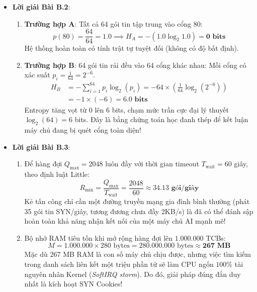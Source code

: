 \begin{itemize}
  \item \textbf{Lời giải Bài B.2}:
  \begin{enumerate}
    \item \textbf{Trường hợp A}: Tất cả 64 gói tin tập trung vào cổng 80:
    \begin{equation*}
    p(80) = \frac{64}{64} = 1.0 \implies H_A = - (1.0 \log_2 1.0) = \mathbf{0 \text{ bits}}
    \end{equation*}
    Hệ thống hoàn toàn có tính trật tự tuyệt đối (không có độ bất định).
    \item \textbf{Trường hợp B}: 64 gói tin rải đều vào 64 cổng khác nhau:
    Mỗi cổng có xác suất $p_i = \frac{1}{64} = 2^{-6}$.
    \begin{align*}
    H_B &= - \sum_{i=1}^{64} p_i \log_2(p_i) = - 64 \times \left( \frac{1}{64} \log_2(2^{-6}) \right) \\
    &= - 1 \times (-6) = \mathbf{6.0 \text{ bits}}
    \end{align*}
    Entropy tăng vọt từ 0 lên 6 bits, chạm mức trần cực đại lý thuyết $\log_2(64) = 6$ bits. Đây là bằng chứng toán học đanh thép để kết luận máy chủ đang bị quét cổng toàn diện!
  \end{enumerate}

  \item \textbf{Lời giải Bài B.3}:
  \begin{enumerate}
    \item Để hàng đợi $Q_{\max} = 2048$ luôn đầy với thời gian timeout $T_{\text{wait}} = 60$ giây, theo định luật Little:
    \begin{equation*}
    R_{\min} = \frac{Q_{\max}}{T_{\text{wait}}} = \frac{2048}{60} \approx \mathbf{34.13 \text{ gói/giây}}
    \end{equation*}
    Kẻ tấn công chỉ cần một đường truyền mạng gia đình bình thường (phát 35 gói tin SYN/giây, tương đương chưa đầy 2KB/s) là đã có thể đánh sập hoàn toàn khả năng nhận kết nối của một máy chủ AI mạnh mẽ!
    \item Bộ nhớ RAM tiêu tốn khi mở rộng hàng đợi lên $1.000.000$ TCBs:
    \begin{equation*}
    M = 1.000.000 \times 280 \text{ bytes} = 280.000.000 \text{ bytes} \approx \mathbf{267 \text{ MB}}
    \end{equation*}
    Mặc dù 267 MB RAM là con số máy chủ chịu được, nhưng việc tìm kiếm trong danh sách liên kết một triệu phần tử sẽ làm CPU ngốn $100\%$ tài nguyên nhân Kernel (\textit{SoftIRQ storm}). Do đó, giải pháp đúng đắn duy nhất là kích hoạt SYN Cookies!
  \end{enumerate}


\end{itemize}
